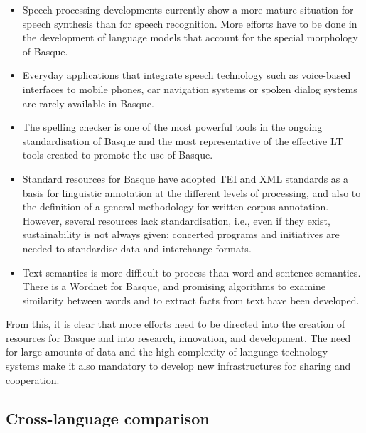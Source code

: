 \begin{multicols}{2}
    \begin{itemize}
      \item Speech processing developments currently show a more mature situation for speech synthesis than for speech recognition. More efforts have to be done in the development of language models that account for the special morphology of Basque.   
      \item Everyday applications that integrate speech technology such as voice-based interfaces to mobile phones, car navigation systems or spoken dialog systems are rarely available in Basque. 
      \item The spelling checker is one of the most powerful tools in the ongoing standardisation of Basque and the most representative of the effective LT tools created to promote the use of Basque. 
      \item Standard resources for Basque have adopted TEI and XML standards as a basis for linguistic annotation at the different levels of processing, and also to the definition of a general methodology for written corpus annotation. However, several resources lack standardisation, i.e., even if they exist, sustainability is not always given; concerted programs and initiatives are needed to standardise data and interchange formats.
      \item Text semantics is more difficult to process than word and sentence semantics. There is a Wordnet for Basque, and promising algorithms to examine similarity between words and to extract facts from text have been developed. 
    \end{itemize}
    
    From this, it is clear that more efforts need to be directed into the creation of resources for Basque and into research, innovation, and development. The need for large amounts of data and the high complexity of language technology systems make it also mandatory to develop new infrastructures for sharing and cooperation.

\subsection{Cross-language comparison}


\end{multicols}
